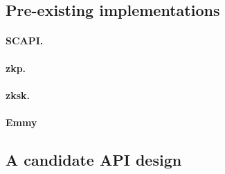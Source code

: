 \documentclass[runningheads]{llncs}
\begin{document}
\subsection{Pre-existing implementations}
\paragraph{SCAPI.}
\paragraph{zkp.}
\paragraph{zksk.}
\paragraph{Emmy}

\subsection{A candidate API design}



%
\end{document}
